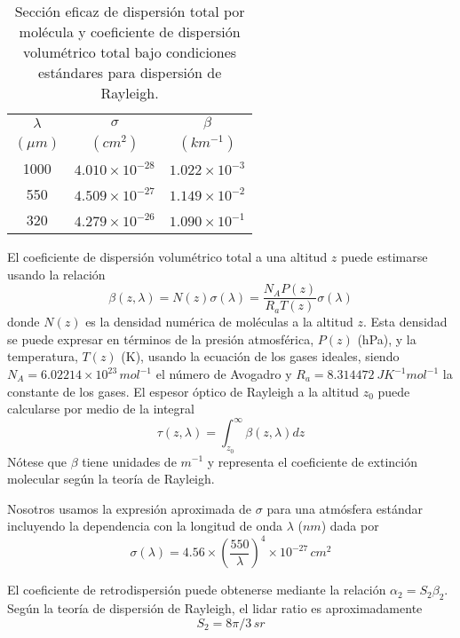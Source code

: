 \documentclass[12pt,a4paper,final]{report}
\begin{document}
    \begin{table}
    \centering
	\begin{tabular}{ c c c }
		\hline
		$\lambda$ & $\sigma$ & $\beta$ \\
		$(\mu m)$   & $(cm^2)$ & $(km^{-1})$ \\ \hline
		1000 & $4.010 \times 10^{-28}$ & $1.022 \times 10^{-3}$ \\
		550 & $4.509 \times 10^{-27}$ & $1.149 \times 10^{-2}$ \\
		320 & $4.279 \times 10^{-26}$ & $1.090 \times 10^{-1}$ \\ \hline
	\end{tabular}
   	\caption{Sección eficaz de dispersión total por molécula y coeficiente de dispersión  volumétrico total bajo condiciones estándares para dispersión de Rayleigh.}
   	\label{tab:rayleigh}
    \end{table}
	
    El coeficiente de dispersión  volumétrico total a una altitud $z$ puede estimarse usando la relación \citep{bucholtz1995}
	\begin{equation}
	\beta(z,\lambda) = N(z) \sigma (\lambda) = \dfrac{N_A P(z)}{R_a T(z)} \sigma (\lambda)
	\end{equation}	
	donde $N(z)$ es la densidad numérica de moléculas a la altitud $z$. Esta densidad se puede expresar en términos de la presión atmosférica, $P(z)$ (hPa), y la temperatura, $T(z)$ (K), usando la ecuación de los gases ideales, siendo $N_A = 6.02214 \times 10^{23} \, mol^{-1}$ el número de Avogadro y $R_a = 8.314472 ~ J K^{-1} mol^{-1}$ la constante de los gases. El espesor óptico de Rayleigh a la altitud $z_0$ puede calcularse por medio de la integral
	\begin{equation}
	\tau(z,\lambda)=\int_{z_0}^{\infty} \beta(z,\lambda) dz
	\end{equation}
	Nótese que $\beta$ tiene unidades de $m^{-1}$ y representa el coeficiente de extinción molecular según la teoría de Rayleigh.
	
	Nosotros usamos la expresión aproximada de $\sigma$ para una atmósfera estándar incluyendo la dependencia con la longitud de onda $\lambda$ ($nm$) dada por \citep{hostetler2006}
	\begin{equation}
	\sigma(\lambda) = 4.56 \times \left( \dfrac{550}{\lambda} \right)^4 \times 10^{-27} \, cm^2
	\end{equation}
	
	El coeficiente de retrodispersión puede obtenerse mediante la relación $\alpha_2 = S_2 \beta_2$. 	Según la teoría de dispersión de Rayleigh, el lidar ratio es aproximadamente
	 \begin{equation}
	 S_2 = 8 \pi /3 \, sr
	 \label{eq:s2}
	 \end{equation}
	
\end{document}
